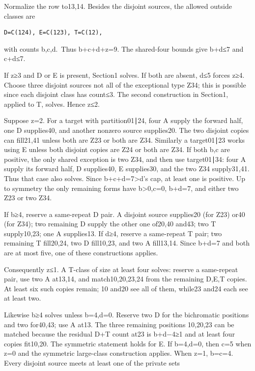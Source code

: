 \documentclass[
  10pt,
]{article}
\begin{document}
Normalize the row to13,14. Besides the disjoint sources, the allowed
outside classes are

\begin{verbatim}
D=C(124), E=C(123), T=C(12),
\end{verbatim}

with counts b,c,d.~Thus b+c+d+z=9. The shared-four bounds give b+d≤7 and
c+d≤7.

If z≥3 and D or E is present, Section1 solves. If both are absent, d≤5
forces z≥4. Choose three disjoint sources not all of the exceptional
type Z34; this is possible since each disjoint class has count≤3. The
second construction in Section1, applied to T, solves. Hence z≤2.

Suppose z=2. For a target with partition01∣24, four A supply the forward
half, one D supplies40, and another nonzero source supplies20. The two
disjoint copies can fill21,41 unless both are Z23 or both are Z34.
Similarly a target01∣23 works using E unless both disjoint copies are
Z24 or both are Z34. If both b,c are positive, the only shared exception
is two Z34, and then use target01∣34: four A supply its forward half, D
supplies40, E supplies30, and the two Z34 supply31,41. Thus that case
also solves. Since b+c+d=7\textgreater d's cap, at least one is
positive. Up to symmetry the only remaining forms have
b\textgreater0,c=0, b+d=7, and either two Z23 or two Z34.

If b≥4, reserve a same-repeat D pair. A disjoint source supplies20 (for
Z23) or40 (for Z34); two remaining D supply the other one of20,40 and43;
two T supply10,23; one A supplies13. If d≥4, reserve a same-repeat T
pair; two remaining T fill20,24, two D fill10,23, and two A fill13,14.
Since b+d=7 and both are at most five, one of these constructions
applies.

Consequently z≤1. A T-class of size at least four solves: reserve a
same-repeat pair, use two A at13,14, and match10,20,23,24 from the
remaining D,E,T copies. At least six such copies remain; 10 and20 see
all of them, while23 and24 each see at least two.

Likewise b≥4 solves unless b=4,d=0. Reserve two D for the bichromatic
positions and two for40,43; use A at13. The three remaining positions
10,20,23 can be matched because the residual D+T count at23 is b+d−4≥1
and at least four copies fit10,20. The symmetric statement holds for E.
If b=4,d=0, then c=5 when z=0 and the symmetric large-class construction
applies. When z=1, b=c=4. Every disjoint source meets at least one of
the private sets
\end{document}
